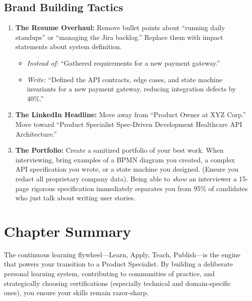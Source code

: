 \documentclass[
  11pt,
  openany,
  oneside]{book}
\providecommand{\tightlist}{%
  \setlength{\itemsep}{0pt}\setlength{\parskip}{0pt}}
\begin{document}
\subsection{Brand Building Tactics}\label{brand-building-tactics}

\begin{enumerate}
\def\labelenumi{\arabic{enumi}.}
\tightlist
\item
  \textbf{The Resume Overhaul:} Remove bullet points about ``running
  daily standups'' or ``managing the Jira backlog.'' Replace them with
  impact statements about system definition.

  \begin{itemize}
  \tightlist
  \item
    \emph{Instead of:} ``Gathered requirements for a new payment
    gateway.''
  \item
    \emph{Write:} ``Defined the API contracts, edge cases, and state
    machine invariants for a new payment gateway, reducing integration
    defects by 40\%.''
  \end{itemize}
\item
  \textbf{The LinkedIn Headline:} Move away from ``Product Owner at XYZ
  Corp.'' Move toward ``Product Specialist \textbar{} Spec-Driven
  Development \textbar{} Healthcare API Architecture.''
\item
  \textbf{The Portfolio:} Create a sanitized portfolio of your best
  work. When interviewing, bring examples of a BPMN diagram you created,
  a complex API specification you wrote, or a state machine you
  designed. (Ensure you redact all proprietary company data). Being able
  to \emph{show} an interviewer a 15-page rigorous specification
  immediately separates you from 95\% of candidates who just talk about
  writing user stories.
\end{enumerate}

\bigskip

\section{Chapter Summary}\label{chapter-summary}

The continuous learning flywheel---Learn, Apply, Teach, Publish---is the
engine that powers your transition to a Product Specialist. By building
a deliberate personal learning system, contributing to communities of
practice, and strategically choosing certifications (especially
technical and domain-specific ones), you ensure your skills remain
razor-sharp.
\end{document}
